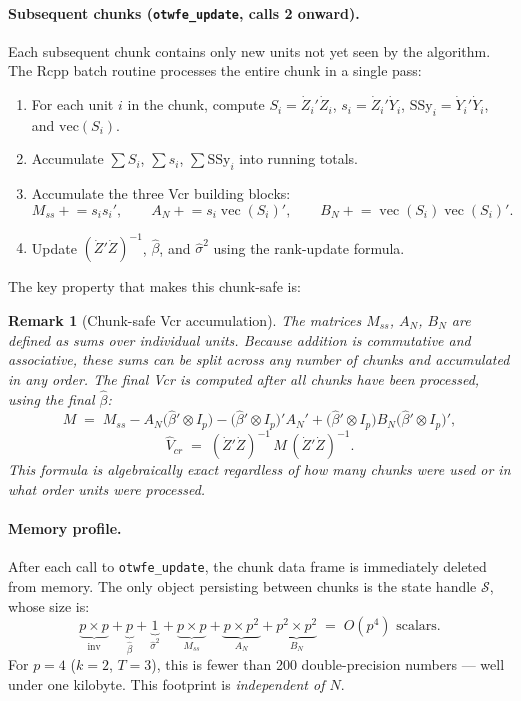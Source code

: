 \documentclass[11pt, a4paper]{article}
\newtheorem{remark}{Remark}
\begin{document}
\paragraph{Subsequent chunks (\texttt{otwfe\_update}, calls 2 onward).}
Each subsequent chunk contains only new units not yet seen by the algorithm.
The Rcpp batch routine processes the entire chunk in a single pass:
\begin{enumerate}
  \item For each unit $i$ in the chunk, compute
        $S_i = \dot{Z}_i'\dot{Z}_i$,\; $s_i = \dot{Z}_i'\dot{Y}_i$,\;
        $\mathrm{SSy}_i = \dot{Y}_i'\dot{Y}_i$, and $\mathrm{vec}(S_i)$.
  \item Accumulate $\sum S_i$, $\sum s_i$, $\sum \mathrm{SSy}_i$
        into running totals.
  \item Accumulate the three Vcr building blocks:
  \[
    M_{ss} \mathrel{+}= s_i s_i', \qquad
    A_N    \mathrel{+}= s_i \operatorname{vec}(S_i)', \qquad
    B_N    \mathrel{+}= \operatorname{vec}(S_i)\operatorname{vec}(S_i)'.
  \]
  \item Update $(\dot{Z}'\dot{Z})^{-1}$, $\hat\beta$, and $\hat\sigma^2$
        using the rank-update formula.
\end{enumerate}

The key property that makes this chunk-safe is:

\begin{remark}[Chunk-safe Vcr accumulation]
The matrices $M_{ss}$, $A_N$, $B_N$ are defined as sums over individual units.
Because addition is commutative and associative, these sums can be split across
any number of chunks and accumulated in any order.  The final Vcr is computed
\emph{after all chunks have been processed}, using the final $\hat\beta$:
\[
  M \;=\;
    M_{ss}
    - A_N\bigl(\hat\beta' \otimes I_p\bigr)
    - \bigl(\hat\beta' \otimes I_p\bigr)' A_N'
    + \bigl(\hat\beta' \otimes I_p\bigr) B_N \bigl(\hat\beta' \otimes I_p\bigr)',
\]
\[
  \hat{V}_{cr} \;=\; (\dot{Z}'\dot{Z})^{-1}\, M\, (\dot{Z}'\dot{Z})^{-1}.
\]
This formula is algebraically exact regardless of how many chunks were used or
in what order units were processed.
\end{remark}

\paragraph{Memory profile.}
After each call to \texttt{otwfe\_update}, the chunk data frame is immediately
deleted from memory.  The only object persisting between chunks is the state
handle $\mathcal{S}$, whose size is:
\[
  \underbrace{p \times p}_{\text{inv}} +
  \underbrace{p}_{\hat\beta} +
  \underbrace{1}_{\hat\sigma^2} +
  \underbrace{p \times p}_{M_{ss}} +
  \underbrace{p \times p^2}_{A_N} +
  \underbrace{p^2 \times p^2}_{B_N}
  \;=\; O(p^4) \text{ scalars.}
\]
For $p = 4$ ($k=2$, $T=3$), this is fewer than 200 double-precision numbers
--- well under one kilobyte.  This footprint is \emph{independent of $N$}.
\end{document}
